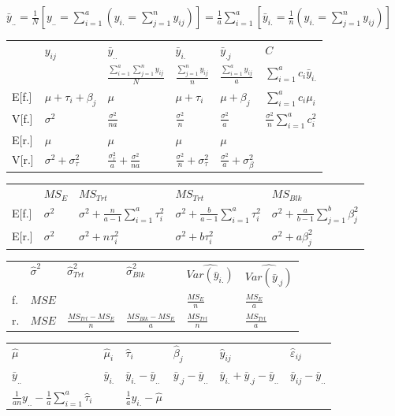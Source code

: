 \documentclass[10pt,portrait]{article}
\begin{document}
\begin{multicols}{2}
$\bar y_{..}=\frac{1}N\left[y_{..}=\sum^a_{i=1}(y_{i.}=\sum^n_{j=1}y_{ij})\right]=\frac{1}a\sum^a_{i=1}\left[\bar y_{i.}=\frac{1}n(y_{i.}=\sum^n_{j=1}y_{ij})\right]$

\begin{tabular}{l|l|l|l|l|l}
     &$y_{ij}$  &$\bar y_{..}$&$\bar y_{i.}$&$\bar y_{.j}$& $C$\\
     &          &$\frac{\sum^a_{i=1}\sum^n_{j=1}y_{ij}}N$ & $\frac{\sum^n_{j=1}y_{ij}}n$ & $\frac{\sum^a_{i=1}y_{ij}}a$ & $\sum^{a}_{i=1}c_i\bar y_{i.}$\\
E[f.]  &  $\mu+\tau_i+\beta_j$   &  $\mu$      & $\mu+\tau_i$ &$\mu+\beta_j$ & $\sum^{a}_{i=1}c_i\mu_{i}$\\
V[f.]  &$\sigma^2$&$\frac{\sigma^2}{na}$&$\frac{\sigma^2}{n}$&$\frac{\sigma^2}{a}$ & $\frac{\sigma^2}n\sum^{a}_{i=1}c_i^2$\\\hline
E[r.]  &  $\mu$   &  $\mu$      &$\mu$ & $\mu$  \\
V[r.]  &$\sigma^2+\sigma_\tau^2$&$\frac{\sigma_\tau^2}{a}+\frac{\sigma^2}{na}$&$\frac{\sigma^2}{n}+\sigma_\tau^2$&$\frac{\sigma^2}{a}+\sigma_\beta^2$\\
\hline
\end{tabular}

\begin{tabular}{l|l|l|l|l}
     &$MS_{E}$  & $MS_{Trt}$ & $MS_{Trt}$ & $MS_{Blk}$ \\
E[f.]&$\sigma^2$& $\sigma^2+\frac{n}{a-1}\sum_{i=1}^a\tau_i^2$& $\sigma^2+\frac{b}{a-1}\sum_{i=1}^a\tau_i^2$&$\sigma^2+\frac{a}{b-1}\sum_{j=1}^b\beta_j^2$\\
E[r.]&$\sigma^2$& $\sigma^2+n\tau_i^2$& $\sigma^2+b\tau_i^2$ & $\sigma^2+a\beta_j^2$\\
\hline
\end{tabular}

\begin{tabular}{l|l|l|l|l|l}
&$\hat\sigma^2$&$\hat\sigma_{Trt}^2$&$\hat\sigma_{Blk}^2$&$\widehat{Var(\bar y_{i.})}$&$\widehat{Var(\bar y_{.j})}$\\
f.&$MSE$& & &$\frac{MS_{E}}{n}$& $\frac{MS_{E}}{a}$\\
r.&$MSE$&$\frac{MS_{Trt}-MS_{E}}{n}$&$\frac{MS_{Blk}-MS_{E}}{a}$&$\frac{MS_{Trt}}{n}$&$\frac{MS_{Trt}}{a}$\\
\end{tabular}

\begin{tabular}{l|l|l|l|l|l}
$\hat\mu$&$\hat\mu_i$&$\hat\tau_i$&$\hat\beta_j$&$\hat y_{ij}$&$\hat\varepsilon_{ij}$\\
$\bar y_{..}$&$\bar y_{i.}$&$\bar y_{i.}-\bar y_{..}$&$\bar y_{.j}-\bar y_{..}$&$\bar y_{i.}+\bar y_{.j}-\bar y_{..}$&$\bar y_{ij}-\bar y_{..}$\\
$\frac1{an}y_{..}-\frac1{a}\sum_{i=1}^a\hat\tau_i$& & $\frac1{a}y_{i.}-\hat\mu$\\
\hline
\end{tabular}


\end{multicols}
\end{document}
